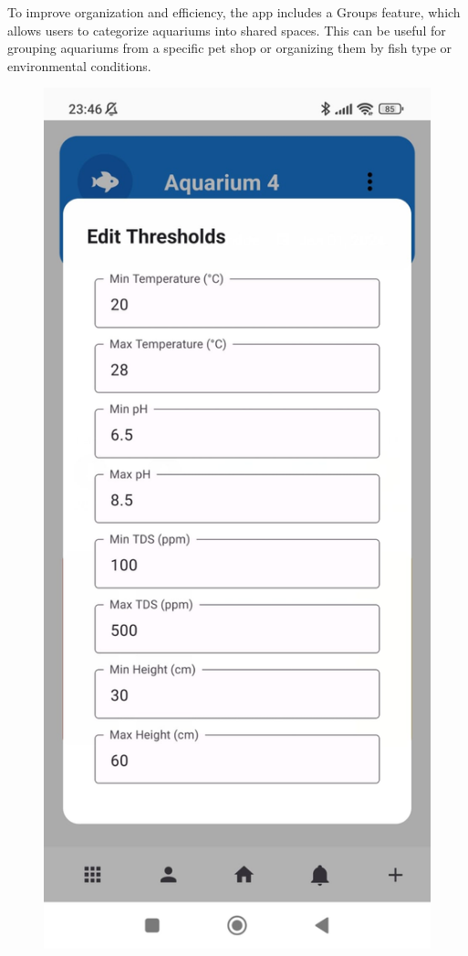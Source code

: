 \documentclass[11pt,a4paper]{article}
\begin{document}
\vspace{2em}
To improve organization and efficiency, the app includes a Groups feature, which allows users to categorize aquariums into shared spaces. This can be useful for grouping aquariums from a specific pet shop or organizing them by fish type or environmental conditions.

\begin{figure}[H]
    \centering
    \begin{minipage}{0.35\textwidth}
        \centering
        \includegraphics[width=\linewidth]{Images/thresholds.jpeg}

\end{minipage}
\end{figure}
\end{document}
